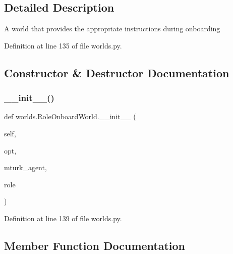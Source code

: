 \subsection{Detailed Description}
\begin{DoxyVerb}A world that provides
   the appropriate instructions during onboarding\end{DoxyVerb}
 

Definition at line 135 of file worlds.\+py.



\subsection{Constructor \& Destructor Documentation}
\mbox{\label{classworlds_1_1RoleOnboardWorld_abbc8f1021ee70a0f80a0d1ccb5da7ee6}} 
\subsubsection{\texorpdfstring{\+\_\+\+\_\+init\+\_\+\+\_\+()}{\_\_init\_\_()}}
{\footnotesize\ttfamily def worlds.\+Role\+Onboard\+World.\+\_\+\+\_\+init\+\_\+\+\_\+ (\begin{DoxyParamCaption}\item[{}]{self,  }\item[{}]{opt,  }\item[{}]{mturk\+\_\+agent,  }\item[{}]{role }\end{DoxyParamCaption})}



Definition at line 139 of file worlds.\+py.



\subsection{Member Function Documentation}
\mbox{\label{classworlds_1_1RoleOnboardWorld_a3adcbdb41aa941d672d4d0f3ebbd27e4}} 
